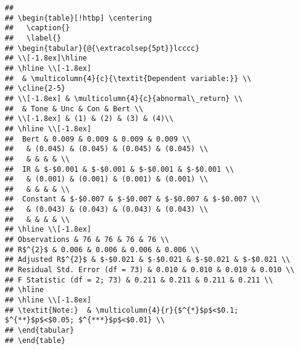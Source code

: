 \documentclass[
]{article}
\begin{document}
\begin{verbatim}
## 
## \begin{table}[!htbp] \centering 
##   \caption{} 
##   \label{} 
## \begin{tabular}{@{\extracolsep{5pt}}lcccc} 
## \\[-1.8ex]\hline 
## \hline \\[-1.8ex] 
##  & \multicolumn{4}{c}{\textit{Dependent variable:}} \\ 
## \cline{2-5} 
## \\[-1.8ex] & \multicolumn{4}{c}{abnormal\_return} \\ 
##  & Tone & Unc & Con & Bert \\ 
## \\[-1.8ex] & (1) & (2) & (3) & (4)\\ 
## \hline \\[-1.8ex] 
##  Bert & 0.009 & 0.009 & 0.009 & 0.009 \\ 
##   & (0.045) & (0.045) & (0.045) & (0.045) \\ 
##   & & & & \\ 
##  IR & $-$0.001 & $-$0.001 & $-$0.001 & $-$0.001 \\ 
##   & (0.001) & (0.001) & (0.001) & (0.001) \\ 
##   & & & & \\ 
##  Constant & $-$0.007 & $-$0.007 & $-$0.007 & $-$0.007 \\ 
##   & (0.043) & (0.043) & (0.043) & (0.043) \\ 
##   & & & & \\ 
## \hline \\[-1.8ex] 
## Observations & 76 & 76 & 76 & 76 \\ 
## R$^{2}$ & 0.006 & 0.006 & 0.006 & 0.006 \\ 
## Adjusted R$^{2}$ & $-$0.021 & $-$0.021 & $-$0.021 & $-$0.021 \\ 
## Residual Std. Error (df = 73) & 0.010 & 0.010 & 0.010 & 0.010 \\ 
## F Statistic (df = 2; 73) & 0.211 & 0.211 & 0.211 & 0.211 \\ 
## \hline 
## \hline \\[-1.8ex] 
## \textit{Note:}  & \multicolumn{4}{r}{$^{*}$p$<$0.1; $^{**}$p$<$0.05; $^{***}$p$<$0.01} \\ 
## \end{tabular} 
## \end{table}
\end{verbatim}
\end{document}
